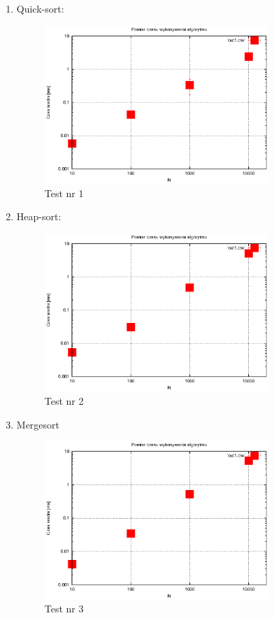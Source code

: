 \documentclass[a4paper,11pt]{article}
\begin{document}
\begin{enumerate}
 \item Quick-sort:
 \begin{figure}[!h]
\centering
\includegraphics[width=0.8\textwidth]{../prj/wykres7.eps}
\caption{Test nr 1}
\label{Test nr 1}
\end{figure} 
\newpage
 \item Heap-sort:
 \begin{figure}[!h]
\centering
\includegraphics[width=0.8\textwidth]{../prj/wykres8.eps}
\caption{Test nr 2}
\label{Test nr 2}
\end{figure} 
\item Mergesort

 \begin{figure}[!h]
\centering
\includegraphics[width=0.8\textwidth]{../prj/wykres9.eps}
\caption{Test nr 3}
\label{Test nr 3}
\end{figure} 


\end{enumerate}
\end{document}
